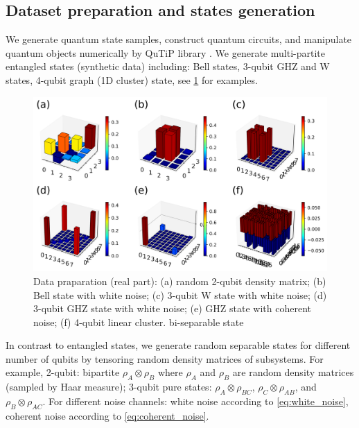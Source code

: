 \documentclass[
aps,
pra,
twocolumn,
floatfix,
]{revtex4-2}
\theoremstyle{plain}
\theoremstyle{definition}
\newcommand{\dm}{\rho}
\begin{document}
\subsection{Dataset preparation and states generation}\label{sec:data}
We generate quantum state samples, construct quantum circuits, and manipulate quantum objects numerically by QuTiP library \cite{johanssonQuTiPPythonFramework2013} \cite{liPulselevelNoisyQuantum2022}.
We generate multi-partite entangled states (synthetic data) including: Bell states, 3-qubit GHZ and W states, 4-qubit graph (1D cluster) state, see \cref{fig:sample_data} for examples.
\begin{figure}[!ht]
	\centering
	\includegraphics[width=.9\linewidth]{./Code/dataset_sample_3x2.png}
	\caption{Data praparation (real part): (a) random 2-qubit density matrix; (b) Bell state with white noise; (c) 3-qubit W state with white noise; (d) 3-qubit GHZ state with white noise; (e) GHZ state with coherent noise; (f) 4-qubit linear cluster. bi-separable state}
	\label{fig:sample_data}
\end{figure}
In contrast to entangled states, we generate random separable states for different number of qubits by tensoring random density matrices of subsystems.
For example,
2-qubit: bipartite $\rho_A\otimes \rho_B$ where $\rho_A$ and $\rho_B$ are random density matrices (sampled by Haar measure);
3-qubit pure states: $\dm_A\otimes \dm_{BC}$, $\dm_C\otimes \dm_{AB}$, and $\dm_B\otimes \dm_{AC}$.
For different noise channels: white noise according to \cref{eq:white_noise}, coherent noise according to \cref{eq:coherent_noise}.
\end{document}
